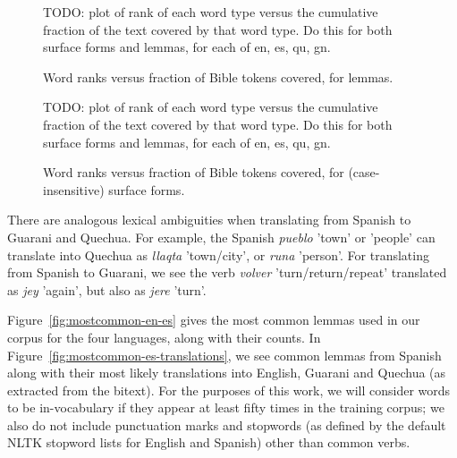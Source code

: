 \begin{figure*}
TODO: plot of rank of each word type versus the cumulative fraction of the text
covered by that word type. Do this for both surface forms and lemmas, for each
of en, es, qu, gn.
  \caption{Word ranks versus fraction of Bible tokens covered, for lemmas.}
  \label{fig:mostcommon-lemmas}
\end{figure*}

\begin{figure*}
TODO: plot of rank of each word type versus the cumulative fraction of the text
covered by that word type. Do this for both surface forms and lemmas, for each
of en, es, qu, gn.
  \caption{Word ranks versus fraction of Bible tokens covered, for
  (case-insensitive) surface forms.}
  \label{fig:mostcommon-lemmas}
\end{figure*}

There are analogous lexical ambiguities when translating from Spanish to
Guarani and Quechua.
For example, the Spanish \emph{pueblo} 'town' or 'people' can translate into
Quechua as \emph{llaqta} 'town/city', or \emph{runa} 'person'.
For translating from Spanish to Guarani, we see the verb \emph{volver}
'turn/return/repeat' translated as \emph{jey} 'again', but also as \emph{jere}
'turn'.

Figure~\ref{fig:mostcommon-en-es} gives the most common lemmas used in our
corpus for the four languages, along with their counts. In
Figure~\ref{fig:mostcommon-es-translations}, we see common lemmas from
Spanish along with their most likely translations into English, Guarani and
Quechua (as extracted from the bitext). For the purposes of this work, we will
consider words to be in-vocabulary if they appear at least fifty times in the
training corpus; we also do not include punctuation marks and stopwords (as
defined by the default NLTK stopword lists for English and Spanish) other than
common verbs.


